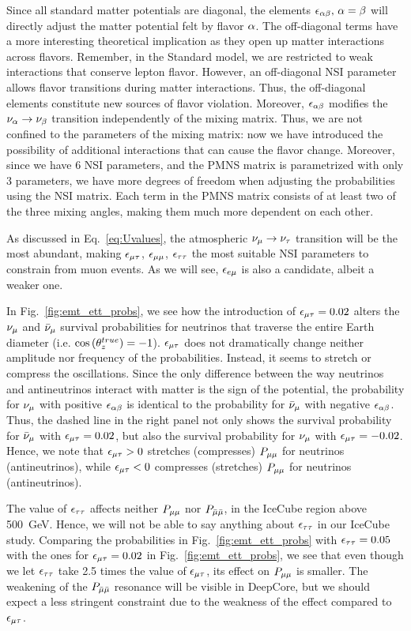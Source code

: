 Since all standard matter potentials are diagonal, 
the elements $\epsilon_{\alpha\beta},\, \alpha = \beta$ will directly adjust the matter potential felt 
by flavor $\alpha$. The off-diagonal terms have a more interesting theoretical implication as they open up matter interactions across flavors. Remember, in the Standard model,
we are restricted to weak interactions that conserve lepton flavor. However, an off-diagonal NSI parameter allows flavor transitions during matter interactions. Thus,
the off-diagonal elements constitute new sources of flavor violation.
Moreover, $\epsilon_{\alpha\beta}$ modifies the $\nu_\alpha \to \nu_\beta$ transition independently
of the mixing matrix. Thus, we are not confined to the parameters of the mixing matrix: now we have introduced the 
possibility of additional interactions that can cause the flavor change. Moreover, since we have 6 NSI parameters, and the PMNS
matrix is parametrized with only 3 parameters, we have more degrees of freedom when adjusting the probabilities using the NSI matrix. Each term in the PMNS matrix consists of at least
two of the three mixing angles, making them much more dependent on each other.

As discussed in Eq.~\ref{eq:Uvalues}, the atmospheric $\nu_\mu \to \nu_\tau$ transition will be the most abundant, making $\epsilon_{\mu\tau}$, $\epsilon_{\mu\mu}$, $\epsilon_{\tau\tau}$ the most suitable
NSI parameters to constrain from muon events. As we will see, $\epsilon_{e\mu}$ is also a candidate, albeit a weaker one. 

In Fig.~\ref{fig:emt_ett_probs}, we see how the introduction of $\epsilon_{\mu\tau} = 0.02$ alters the $\nu_\mu$ and $\bar{\nu}_\mu$ survival probabilities
for neutrinos that traverse the entire Earth diameter (i.e. $\cos{(\theta_z^{true})} = -1$). $\epsilon_{\mu\tau}$ does not dramatically change neither
amplitude nor frequency of the probabilities. Instead, it seems to stretch or compress the oscillations. Since the 
only difference between the way neutrinos and antineutrinos interact with matter is the sign of the potential, the probability for
$\nu_\mu$ with positive $\epsilon_{\alpha\beta}$ is identical to the probability for $\bar{\nu}_\mu$ with negative $\epsilon_{\alpha\beta}$. Thus, the dashed line 
in the right panel not only shows the survival probability for $\bar{\nu}_\mu$ with $\epsilon_{\mu\tau}=0.02$, but also the survival probability for $\nu_\mu$ with $\epsilon_{\mu\tau}=-0.02$.
Hence, we note that $\epsilon_{\mu\tau} > 0$ stretches (compresses) $P_{\mu\mu}$ for neutrinos (antineutrinos), while $\epsilon_{\mu\tau} < 0$ compresses (stretches) $P_{\mu\mu}$ for neutrinos (antineutrinos).

The value of $\epsilon_{\tau\tau}$ affects neither $P_{\mu\mu}$ nor $P_{\bar{\mu} \bar{\mu}}$, in the IceCube region above \SI{500}{\GeV}. Hence, we will not be able
to say anything about $\epsilon_{\tau\tau}$ in our IceCube study.  Comparing the probabilities in Fig.~\ref{fig:emt_ett_probs} with $\epsilon_{\tau\tau} = 0.05$ with the ones for $\epsilon_{\mu\tau} = 0.02$ in Fig.~\ref{fig:emt_ett_probs},
we see that even though we let $\epsilon_{\tau\tau}$ take 2.5 times the value of $\epsilon_{\mu\tau}$, its effect on $P_{\mu\mu}$ is smaller. The weakening of the $P_{\bar{\mu} \bar{\mu}}$ resonance will be visible in DeepCore, but we should expect a less stringent 
constraint due to the weakness of the effect compared to $\epsilon_{\mu\tau}$. 

